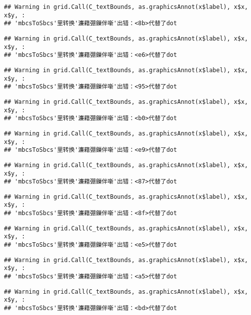 \documentclass[]{article}
\begin{document}
\begin{verbatim}
## Warning in grid.Call(C_textBounds, as.graphicsAnnot(x$label), x$x, x$y, :
## 'mbcsToSbcs'里转换'濂藉弸鏁伴噺'出错：<8b>代替了dot
\end{verbatim}

\begin{verbatim}
## Warning in grid.Call(C_textBounds, as.graphicsAnnot(x$label), x$x, x$y, :
## 'mbcsToSbcs'里转换'濂藉弸鏁伴噺'出错：<e6>代替了dot
\end{verbatim}

\begin{verbatim}
## Warning in grid.Call(C_textBounds, as.graphicsAnnot(x$label), x$x, x$y, :
## 'mbcsToSbcs'里转换'濂藉弸鏁伴噺'出错：<95>代替了dot
\end{verbatim}

\begin{verbatim}
## Warning in grid.Call(C_textBounds, as.graphicsAnnot(x$label), x$x, x$y, :
## 'mbcsToSbcs'里转换'濂藉弸鏁伴噺'出错：<b0>代替了dot
\end{verbatim}

\begin{verbatim}
## Warning in grid.Call(C_textBounds, as.graphicsAnnot(x$label), x$x, x$y, :
## 'mbcsToSbcs'里转换'濂藉弸鏁伴噺'出错：<e9>代替了dot
\end{verbatim}

\begin{verbatim}
## Warning in grid.Call(C_textBounds, as.graphicsAnnot(x$label), x$x, x$y, :
## 'mbcsToSbcs'里转换'濂藉弸鏁伴噺'出错：<87>代替了dot
\end{verbatim}

\begin{verbatim}
## Warning in grid.Call(C_textBounds, as.graphicsAnnot(x$label), x$x, x$y, :
## 'mbcsToSbcs'里转换'濂藉弸鏁伴噺'出错：<8f>代替了dot
\end{verbatim}

\begin{verbatim}
## Warning in grid.Call(C_textBounds, as.graphicsAnnot(x$label), x$x, x$y, :
## 'mbcsToSbcs'里转换'濂藉弸鏁伴噺'出错：<e5>代替了dot
\end{verbatim}

\begin{verbatim}
## Warning in grid.Call(C_textBounds, as.graphicsAnnot(x$label), x$x, x$y, :
## 'mbcsToSbcs'里转换'濂藉弸鏁伴噺'出错：<a5>代替了dot
\end{verbatim}

\begin{verbatim}
## Warning in grid.Call(C_textBounds, as.graphicsAnnot(x$label), x$x, x$y, :
## 'mbcsToSbcs'里转换'濂藉弸鏁伴噺'出错：<bd>代替了dot
\end{verbatim}
\end{document}
